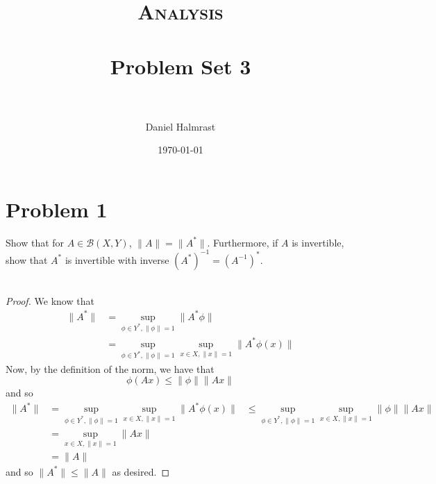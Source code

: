 \documentclass[fontsize=11pt]{scrartcl} %
\title{	
\normalfont \normalsize 
\textsc{Analysis} \\ [25pt] %
\horrule{0.5pt} \\[0.4cm] %
\huge Problem Set 3 \\ %
\horrule{2pt} \\[0.5cm] %
}
\author{Daniel Halmrast} %
\date{\normalsize\today} %
\numberwithin{equation}{section} %
\numberwithin{figure}{section} %
\numberwithin{table}{section} %
\begin{document}
\maketitle %


\section*{Problem 1}
Show that for $A\in \mathscr{B}(X,Y)$, $\|A\| = \|A^*\|$. Furthermore, if $A$ is
invertible, show that $A^*$ is invertible with inverse $(A^*)^{-1} =
(A^{-1})^*$.
\\
\\
\begin{proof}
    We know that
    \[
        \begin{aligned}
            \|A^*\| &= \sup_{\phi\in Y^*,\|\phi\|=1}\|A^*\phi\|\\
            &= \sup_{\phi\in Y^*,\|\phi\|=1}\sup_{x\in X,\|x\|=1}\|A^*\phi(x)\|
        \end{aligned}
    \]
    Now, by the definition of the norm, we have that
    \[
        \phi(Ax)\leq \|\phi\|\|Ax\|
    \]
    and so
    \[
        \begin{aligned}
            \|A^*\| &= \sup_{\phi\in Y^*,\|\phi\|=1}\sup_{x\in X,\|x\|=1}\|A^*\phi(x)\|
                    &\leq\sup_{\phi\in Y^*,\|\phi\|=1}\sup_{x\in
                    X,\|x\|=1}\|\phi\|\|Ax\|\\
                    &= \sup_{x\in X,\|x\|=1} \|Ax\|\\
                    &= \|A\|
        \end{aligned}
    \]
    and so $\|A^*\|\leq \|A\|$ as desired.


\end{proof}
\end{document}
